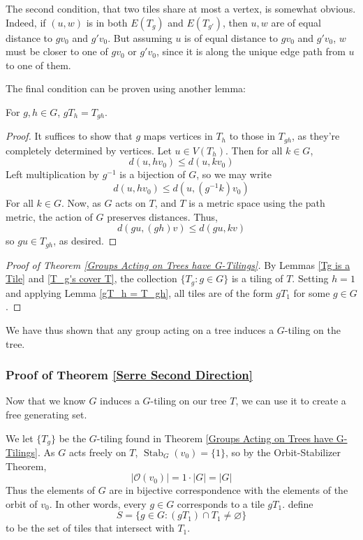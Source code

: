 The second condition, that two tiles share at most a vertex, is somewhat obvious. Indeed, if $(u,w)$ is in both $E(T_g)$ and $E(T_{g'})$, then $u,w$ are of equal distance to $gv_0$ and $g'v_0$. But assuming $u$ is of equal distance to $gv_0$ and $g'v_0$, $w$ must be closer to one of $gv_0$ or $g'v_0$, since it is along the unique edge path from $u$ to one of them. 

The final condition can be proven using another lemma: 

\begin{lemma}\label{gT_h = T_gh}
    For $g,h \in G$, $gT_h = T_{gh}$.
\end{lemma}

\begin{proof}
    It suffices to show that $g$ maps vertices in $T_h$ to those in $T_{gh}$, as they're completely determined by vertices. Let $u \in V(T_h)$. Then for all $k \in G$,
    \[
    d(u,hv_0) \leq d(u,kv_0)
    \]
    Left multiplication by $g^{-1}$ is a bijection of $G$, so we may write 
    \[
    d(u,hv_0) \leq d(u,(g^{-1}k)v_0)
    \]
    For all $k \in G$. Now, as $G$ acts on $T$, and $T$ is a metric space using the path metric, the action of $G$ preserves distances. Thus,
    \[
    d(gu, (gh)v) \leq d(gu,kv)
    \]
    so $gu \in T_{gh}$, as desired. 
\end{proof}

\begin{proof}[Proof of Theorem \ref{Groups Acting on Trees have G-Tilings}]
    By Lemmas \ref{Tg is a Tile} and \ref{T_g's cover T}, the collection $\{T_g: g \in G\}$ is a tiling of $T$. Setting $h = 1$ and applying Lemma \ref{gT_h = T_gh}, all tiles are of the form $gT_1$ for some $g \in G$.
\end{proof}

We have thus shown that any group acting on a tree induces a $G$-tiling on the tree.

\subsubsection{Proof of Theorem \ref{Serre Second Direction}}

Now that we know $G$ induces a $G$-tiling on our tree $T$, we can use it to create a free generating set. 

We let $\{T_g\}$ be the $G$-tiling found in Theorem \ref{Groups Acting on Trees have G-Tilings}. As $G$ acts freely on $T$, $\operatorname{Stab}_G(v_0) = \{1\}$, so by the Orbit-Stabilizer Theorem,
\[|\mathcal{O}(v_0)| = 1 \cdot |G| = |G|\]
Thus the elements of $G$ are in bijective correspondence with the elements of the orbit of $v_0$. In other words, every $g \in G$ corresponds to a tile $gT_1$. define 
\[
S = \{g \in G : (gT_1) \cap T_1 \neq \varnothing\}
\]
to be the set of tiles that intersect with $T_1$.

